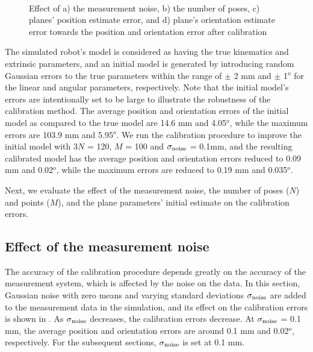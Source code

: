 \begin{figure*}[t]
  \centering
  \quad
  \\[-0.4ex]
  \centering
  \quad\quad
  \quad  
   \caption{Effect of a) the measurement noise, b) the number of poses, c) planes' position estimate error, and d) plane's orientation estimate error towards the position and orientation error after calibration}
\end{figure*}

The simulated robot's model is considered as having the true kinematics and extrinsic parameters, and an initial model is generated by introducing random Gaussian errors to the true parameters within the range of $\pm$ 2 mm and $\pm$ 1$^o$ for the linear and angular parameters, respectively. Note that the initial model's errors are intentionally set to be large to illustrate the robustness of the calibration method. The average position and orientation errors of the initial model as compared to the true model are 14.6 mm and 4.05$^o$, while the maximum errors are 103.9 mm and 5.95$^o$. We run the calibration procedure to improve the initial model with $3N$ = 120, $M$ = 100 and $\sigma_{\rm{noise}}$ = 0.1mm, and the resulting calibrated model has the average position and orientation errors reduced to 0.09 mm and 0.02$^o$, while the maximum errors are reduced to 0.19 mm and 0.035$^o$.

Next, we evaluate the effect of the measurement noise, the number of poses ($N$) and points ($M$), and the plane parameters' initial estimate on the calibration errors. 


\subsection{Effect of the measurement noise}
\label{sec:meas_accuracy}
The accuracy of the calibration procedure depends greatly on the accuracy of the measurement system, which is affected by the noise on the data. In this section, Gaussian noise with zero means and varying standard deviations $\sigma_{\rm{noise}}$ are added to the measurement data in the simulation, and its effect on the calibration errors is shown in . As $\sigma_{\rm{noise}}$ decreases, the calibration errors decrease. At $\sigma_{\rm{noise}}$ = 0.1 mm, the average position and orientation errors are around 0.1 mm and 0.02$^o$, respectively. For the subsequent sections, $\sigma_{\rm{noise}}$ is set at 0.1 mm. 

